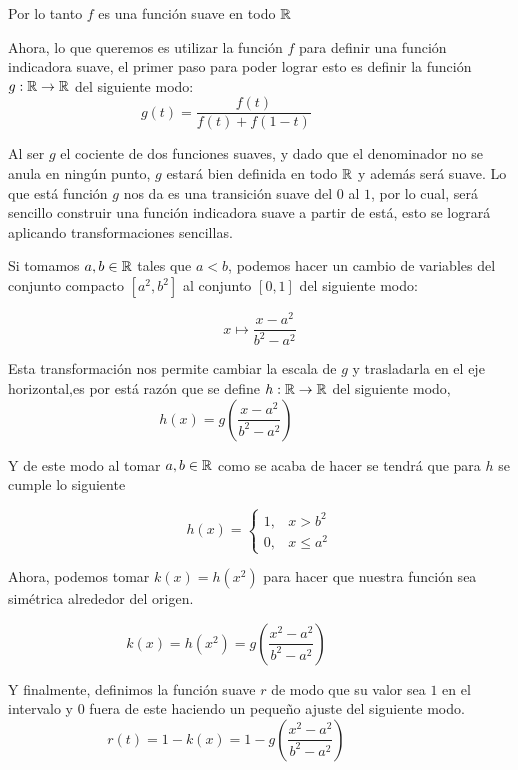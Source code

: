 \begin{example}
	Por lo tanto $f$ es una función suave en todo $\mathbb{R}$

	Ahora, lo que queremos es utilizar la función $f$ para definir una función indicadora suave, el primer paso para poder lograr esto es definir la función $g: \mathbb{R} \to \mathbb{R}$ del siguiente modo:
	\[
		g(t) = \frac{f(t)}{f(t)+f(1-t)}
		\qquad \qquad
		\begin{gathered}
			
		\end{gathered}
	\]


	Al ser $g$ el cociente de dos funciones suaves, y dado que el denominador no se anula en ningún punto, $g$ estará bien definida en todo $\mathbb{R}$ y además será suave. Lo que está función $g$ nos da es una transición suave del $0$ al $1$, por lo cual, será sencillo construir una función indicadora suave a partir de está, esto se logrará aplicando transformaciones sencillas.

	Si tomamos $a,b \in \mathbb{R}$ tales que $a<b$, podemos hacer un cambio de variables del conjunto compacto $[a^2,b^2]$ al conjunto $[0,1]$ del siguiente modo:

	\[
		x \mapsto \frac{x - a^2}{b^2 - a^2}
	\]

	Esta transformación nos permite cambiar la escala de $g$  y trasladarla en el eje horizontal,es por está razón que se define $h: \mathbb{R} \to \mathbb{R}$ del siguiente modo,
	\[
		h(x) = g\left(\frac{x - a^2}{b^2 - a^2}\right)
		\qquad \qquad
		\begin{gathered}
			
		\end{gathered}
	\]

	Y de este modo al tomar $a,b \in \mathbb{R}$ como se acaba de hacer se tendrá que para $h$ se cumple lo siguiente

	\[
		h(x) = \begin{cases}
			1, & x > b^2    \\
			0, & x \leq a^2
		\end{cases}
	\]

	Ahora, podemos tomar $k(x)=h(x^2)$ para hacer que nuestra función sea simétrica alrededor del origen.

	\[
		k(x) = h(x^2) = g\left(\frac{x^2 - a^2}{b^2 - a^2}\right)
		\qquad \qquad
		\begin{gathered}
			
		\end{gathered}
	\]



	Y finalmente, definimos la función suave $r$ de modo que su valor sea $1$ en el intervalo y $0$ fuera de este haciendo un pequeño ajuste del siguiente modo.
	\[
		r(t) = 1 - k(x) = 1 - g\left(\frac{x^2 - a^2}{b^2 - a^2}\right)
		\qquad \qquad
		\begin{gathered}
			
		\end{gathered}
	\]


\end{example}
